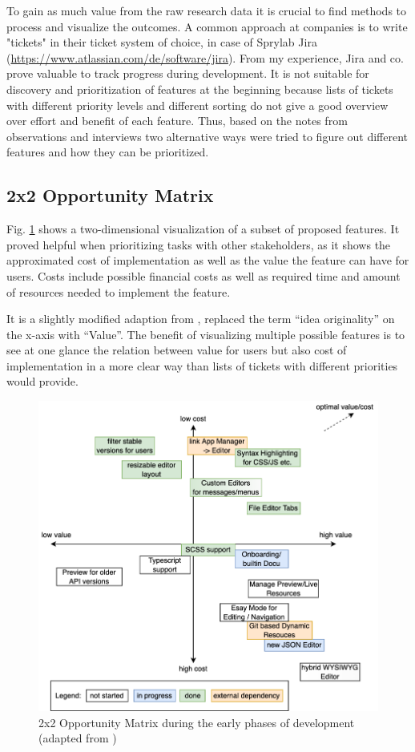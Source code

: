 To gain as much value from the raw research data it is crucial to find methods to process and visualize the outcomes.
A common approach at companies is to write "tickets" in their ticket system of choice, in case of Sprylab Jira (\url{https://www.atlassian.com/de/software/jira}).
From my experience, Jira and co. prove valuable to track progress during development.
It is not suitable for discovery and prioritization of features at the beginning because lists of tickets with different priority levels and different sorting do not give a good overview over effort and benefit of each feature.
Thus, based on the notes from observations and interviews two alternative ways were tried to figure out different features and how they can be prioritized.

\subsection{2x2 Opportunity Matrix}

Fig. \ref{fig:opportunitymatrix} shows a two-dimensional visualization of a subset of proposed features.
It proved helpful when prioritizing tasks with other stakeholders,
as it shows the approximated cost of implementation as well as the value the feature can have for users.
Costs include possible financial costs as well as required time and amount of resources needed to implement the feature.

It is a slightly modified adaption from \cite[p. 181]{LearnHCI:2020ys}, replaced the term ``idea originality'' on the x-axis with ``Value''.
The benefit of visualizing multiple possible features is to see at one glance the relation between value for users but also cost of implementation in a more clear way than lists of tickets with different priorities would provide.

\begin{figure}[h!]
	\centering
  \includegraphics[width=\textwidth]{pics/feature_cost_matrix.drawio.png}
	\caption{2x2 Opportunity Matrix during the early phases of development (adapted from \cite[p. 181]{LearnHCI:2020ys})}
	\label{fig:opportunitymatrix}
\end{figure}


